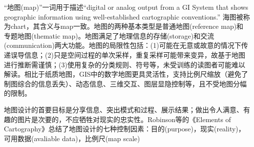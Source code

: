 \par “地图(map)”一词用于描述“digital or analog output from a GI System that shows geographic information using well-established cartographic conventions.” 海图被称为chart，其含义与map一致。地图的两种基本类型是普通地图(reference map)和专题地图(thematic map)。地图满足了地理信息的存储(storage)和交流(communication)两大功能。地图的局限性包括：(1)可能在无意或故意的情况下传递误导信息；(2)只是空间过程的单次采样，重复采样可能带来变异，故基于地图进行推断需谨慎；(3)使用复杂的分类规则、符号等，未受训练的读图者可能难以解读。相比于纸质地图，GIS中的数字地图更具灵活性，支持比例尺缩放（避免了制图综合的信息丢失）、动态信息、三维交互、图层显隐控制等，且不受地图分幅的限制。

\par 地图设计的首要目标是分享信息、突出模式和过程、展示结果；做出令人满意、有趣的图片是次要的，不应牺牲对现实的忠实性。Robinson等的《Elements of Cartography》总结了地图设计的七种控制因素：目的(purpose)，现实(reality)，可用数据(avaliable data)，比例尺(map scale)